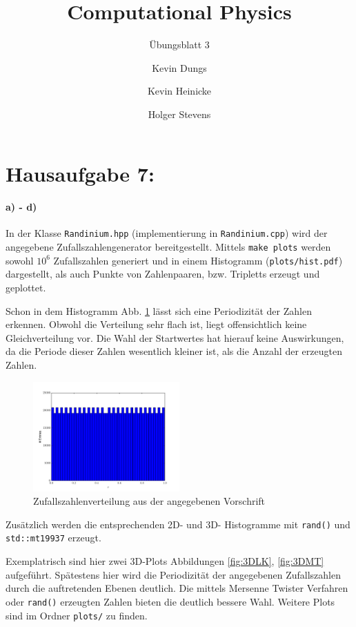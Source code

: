 \documentclass{scrartcl}
\author{Kevin Dungs \and Kevin Heinicke \and Holger Stevens}
\title{Computational Physics}
\subtitle{Übungsblatt 3}
\begin{document}
\maketitle

\section*{Hausaufgabe 7:}
\paragraph{a) - d)} In der Klasse \texttt{Randinium.hpp} (implementierung in \texttt{Randinium.cpp}) wird der angegebene Zufallszahlengenerator bereitgestellt.
Mittels \texttt{make plots} werden sowohl $10^6$ Zufallszahlen generiert und in einem Histogramm (\texttt{plots/hist.pdf}) dargestellt, als auch Punkte von Zahlenpaaren, bzw. Tripletts erzeugt und geplottet.

Schon in dem Histogramm Abb. \ref{fig:histogram} lässt sich eine Periodizität der Zahlen erkennen. Obwohl die Verteilung sehr flach ist, liegt offensichtlich keine Gleichverteilung vor.
Die Wahl der Startwertes hat hierauf keine Auswirkungen, da die Periode dieser Zahlen wesentlich kleiner ist, als die Anzahl der erzeugten Zahlen.

\begin{figure}[H]
    \centering
    \includegraphics[width=0.5\textwidth]{plots/hist.pdf}
    \caption{Zufallszahlenverteilung aus der angegebenen Vorschrift}
    \label{fig:histogram}
\end{figure}

Zusätzlich werden die entsprechenden 2D- und 3D- Histogramme mit \texttt{rand()} und \texttt{std::mt19937} erzeugt.


Exemplatrisch sind hier zwei 3D-Plots Abbildungen \ref{fig:3DLK}, \ref{fig:3DMT} aufgeführt. Spätestens hier wird die Periodizität der angegebenen Zufallszahlen durch die auftretenden Ebenen deutlich. Die mittels Mersenne Twister Verfahren oder \texttt{rand()} erzeugten Zahlen bieten die deutlich bessere Wahl. Weitere Plots sind im Ordner \texttt{plots/} zu finden.
\end{document}
